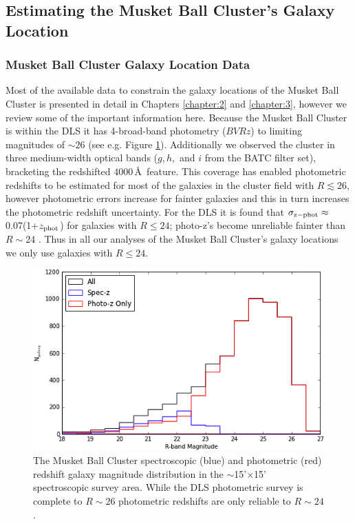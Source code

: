 \subsection{Estimating the Musket Ball Cluster's Galaxy Location}

\subsubsection{Musket Ball Cluster Galaxy Location Data}

Most of the available data to constrain the galaxy locations of the Musket Ball Cluster is presented in detail in Chapters \ref{chapter:2} and \ref{chapter:3}, however we review some of the important information here.
Because the Musket Ball Cluster is within the DLS \citep{Wittman:2002cp} it has 4-broad-band photometry ($BVRz$) to limiting magnitudes of $\sim26$ (see e.g. Figure \ref{figure:PhotozSpeczMagDist}).
Additionally we observed the cluster in three medium-width optical bands ($g,h,$ and $i$ from the BATC filter set), bracketing the redshifted $4000$\,\AA\, feature.
This coverage has enabled photometric redshifts to be estimated for most of the galaxies in the cluster field with $R\lesssim26$, however photometric errors increase for fainter galaxies and this in turn increases the photometric redshift uncertainty.  
For the DLS it is found that $\sigma_{\rm z-phot}\approx$0.07(1+$z_{\rm phot}$) for galaxies with $R\leq24$; photo-z's become unreliable fainter than $R\sim$24 \citep{Schmidt:2013ig}.
Thus in all our analyses of the Musket Ball Cluster's galaxy locations we only use galaxies with $R\leq24$.

\begin{figure}
	\centering
	\includegraphics[width=5in]{Chapter4/AnalysisFiles/magdist.png}
	\caption[Musket Ball Cluster spectroscopic and photometric magnitude distribution.]{
	The Musket Ball Cluster spectroscopic (blue) and photometric (red) redshift galaxy magnitude distribution in the $\sim$15'$\times$15' spectroscopic survey area.
	While the DLS photometric survey is complete to $R\sim26$ photometric redshifts are only reliable to $R\sim24$.
		}
	\label{figure:PhotozSpeczMagDist}
\end{figure}

